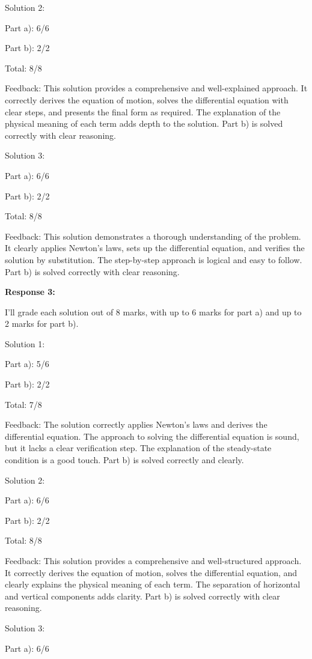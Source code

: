 \documentclass[a4paper,11pt]{article}
\begin{document}
Solution 2:

Part a): 6/6

Part b): 2/2

Total: 8/8

Feedback: This solution provides a comprehensive and well-explained approach. It correctly derives the equation of motion, solves the differential equation with clear steps, and presents the final form as required. The explanation of the physical meaning of each term adds depth to the solution. Part b) is solved correctly with clear reasoning.

Solution 3:

Part a): 6/6

Part b): 2/2

Total: 8/8

Feedback: This solution demonstrates a thorough understanding of the problem. It clearly applies Newton's laws, sets up the differential equation, and verifies the solution by substitution. The step-by-step approach is logical and easy to follow. Part b) is solved correctly with clear reasoning.

\bigskip
\textbf{Response 3:}

I'll grade each solution out of 8 marks, with up to 6 marks for part a) and up to 2 marks for part b).

Solution 1:

Part a): 5/6

Part b): 2/2

Total: 7/8

Feedback: The solution correctly applies Newton's laws and derives the differential equation. The approach to solving the differential equation is sound, but it lacks a clear verification step. The explanation of the steady-state condition is a good touch. Part b) is solved correctly and clearly.

Solution 2:

Part a): 6/6

Part b): 2/2

Total: 8/8

Feedback: This solution provides a comprehensive and well-structured approach. It correctly derives the equation of motion, solves the differential equation, and clearly explains the physical meaning of each term. The separation of horizontal and vertical components adds clarity. Part b) is solved correctly with clear reasoning.

Solution 3:

Part a): 6/6
\end{document}
